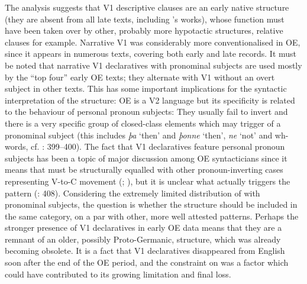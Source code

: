 \documentclass[output=paper,colorlinks,citecolor=brown]{langscibook}
\begin{document}
{The analysis suggests that V1 descriptive clauses are an early native structure (they are absent from all late texts, including 's works), whose function must have been taken over by other, probably more hypotactic structures, relative clauses for example. Narrative V1 was considerably more conventionalised in OE, since it appears in numerous texts, covering both early and late records. It must be noted that narrative V1 declaratives with pronominal subjects are used mostly by the “top four” early OE texts; they alternate with V1 without an overt subject in other  texts. This has some important implications for the syntactic interpretation of the structure: OE is a V2 language but its specificity is related to the behaviour of personal pronoun subjects: They usually fail to invert and there is a very specific group of closed{}-class elements which may trigger  of a pronominal subject (this includes} {\textit{þa}} {‘then' and} {\textit{þonne}} {‘then',} {\textit{ne}} {‘not' and wh-words, cf. \citealt{RingeTaylor2014}: 399--400). The fact that V1 declaratives feature personal pronoun subjects has been a topic of major discussion among OE syntacticians since it means that  must be structurally equalled with other pronoun-inverting cases representing V-to-C movement (\citealt{Pintzuk1999}; \citealt{Ohkado2004}), but it is unclear what actually triggers the pattern (\citealt{RingeTaylor2014}: 408). Considering the extremely limited distribution of  with pronominal subjects, the question is whether the structure should be included in the same category, on a par with other, more well attested patterns. Perhaps the stronger presence of V1 declaratives in early OE data means that they are a remnant of an older, possibly Proto-Germanic, structure, which was already becoming obsolete. It is a fact that V1 declaratives disappeared from English soon after the end of the OE period, and the constraint on  was a factor which could have contributed to its growing limitation and final loss.}
\end{document}
